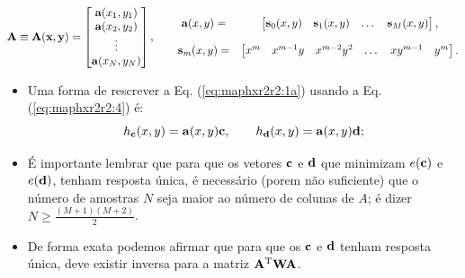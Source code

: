 \begin{theorem}
\begin{equation}\label{eq:maphxr2r2:4}
\MATRIX{A}\equiv\MATRIX{A}(\VECTOR{x},\VECTOR{y})=\begin{bmatrix}
\VECTOR{a}(x_1,y_1)\\
\VECTOR{a}(x_2,y_2)\\
\vdots\\
\VECTOR{a}(x_N,y_N)\\
\end{bmatrix}, \qquad
\begin{matrix}
\VECTOR{a}(x,y)= &
\begin{bmatrix}
\VECTOR{s}_{0}(x,y) & \VECTOR{s}_{1}(x,y) &  \dots  & \VECTOR{s}_{M}(x,y)
\end{bmatrix},\\
~&~\\
\VECTOR{s}_{m}(x,y)=&
\begin{bmatrix}
x^m  & x^{m-1} y  & x^{m-2} y^2    & \dots  & x y^{m-1} &  y^m 
\end{bmatrix}.
\end{matrix}
\end{equation}


\end{theorem}

\begin{tcbattention}
\begin{itemize}
\item Uma forma de rescrever a Eq. (\ref{eq:maphxr2r2:1a}) usando a Eq. (\ref{eq:maphxr2r2:4}) é:
\begin{equation}\label{eq:maphxr2r2:5}
h_{\VECTOR{c}}(x,y) = \VECTOR{a}(x,y)\VECTOR{c}, 
\qquad
h_{\VECTOR{d}}(x,y) = \VECTOR{a}(x,y)\VECTOR{d}; 
\end{equation}

\item É importante lembrar que para que os vetores $\VECTOR{c}$ e $\VECTOR{d}$
que minimizam $e(\VECTOR{c})$ e $e(\VECTOR{d})$, tenham resposta única,
é necessário (porem não suficiente) que o número de amostras $N$ seja maior ao número de colunas de $A$;
é dizer $N\geq \frac{(M+1)(M+2)}{2}$.

\item De forma exata podemos afirmar que para que os $\VECTOR{c}$ e  $\VECTOR{d}$ tenham resposta única,
deve existir inversa para a matriz $\MATRIX{A}^{\transpose}\MATRIX{W}\MATRIX{A}$.

\end{itemize}
\end{tcbattention}


